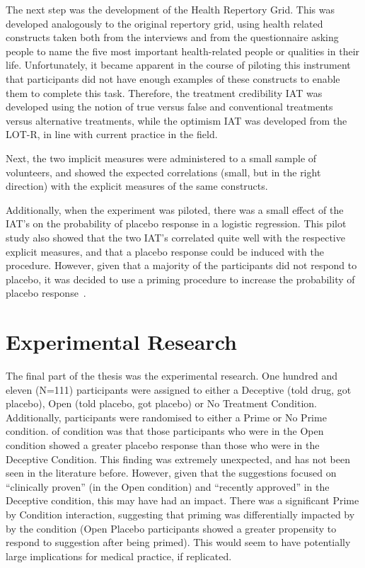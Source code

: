 The next step was the development of the Health Repertory Grid. This
was developed analogously to the original repertory grid, using health
related constructs taken both from the interviews and from the
questionnaire asking people to name the five most important
health-related people or qualities in their life. Unfortunately, it
became apparent in the course of piloting this instrument that
participants did not have enough examples of these constructs to
enable them to complete this task. Therefore, the treatment
credibility IAT was developed using the notion of true versus false
and conventional treatments versus alternative treatments, while the
optimism IAT was developed from the LOT-R, in line with current
practice in the field.

Next, the two implicit measures were administered to a small sample of
volunteers, and showed the expected correlations (small, but in the
right direction) with the explicit measures of the same constructs.

Additionally, when the experiment was piloted, there was a small
effect of the IAT's on the probability of placebo response in a
logistic regression. This pilot study also showed that the two IAT's
correlated quite well with the respective explicit measures, and that
a placebo response could be induced with the procedure. However, given
that a majority of the participants did not respond to placebo, it was
decided to use a priming procedure to increase the probability of
placebo response~\cite{Geers2005a}.

\section{Experimental Research}
\label{sec:exper-rese}

The final part of the thesis was the experimental research. One
hundred and eleven (N=111) participants were assigned to either a
Deceptive (told drug, got placebo), Open (told placebo, got placebo)
or No Treatment Condition. Additionally, participants were randomised
to either a Prime or No Prime condition. %
of condition was that those participants who were in the Open
condition showed a greater placebo response than those who were in the
Deceptive Condition. This finding was extremely unexpected, and has
not been seen in the literature before. However, given that the
suggestions focused on ``clinically proven'' (in the Open condition)
and ``recently approved'' in the Deceptive condition, this may have
had an impact. There was a significant Prime by Condition interaction,
suggesting that priming was differentially impacted by by the
condition (Open Placebo participants showed a greater propensity to
respond to suggestion after being primed). This would seem to have
potentially large implications for medical practice, if replicated.

